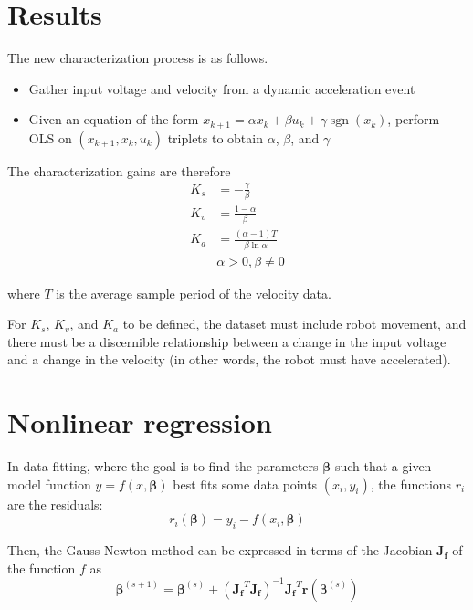 \documentclass[10pt,conference,compsoc]{IEEEtran}
\DeclareMathOperator{\sgn}{sgn}
\newcommand{\mat}[1] {\mathbf{#1}}
\begin{document}
\section{Results}

The new characterization process is as follows.
\begin{itemize}
  \item Gather input voltage and velocity from a dynamic acceleration event
  \item Given an equation of the form
    $x_{k+1} = \alpha x_k + \beta u_k + \gamma\sgn(x_k)$, perform OLS on
    $(x_{k+1}, x_k, u_k)$ triplets to obtain $\alpha$, $\beta$, and $\gamma$
\end{itemize}

The characterization gains are therefore
\begin{align}
  K_s &= -\frac{\gamma}{\beta} \\
  K_v &= \frac{1 - \alpha}{\beta} \\
  K_a &= \frac{(\alpha - 1) T}{\beta \ln\alpha} \\
      &\alpha > 0, \beta \neq 0 \nonumber
\end{align}

where $T$ is the average sample period of the velocity data.

For $K_s$, $K_v$, and $K_a$ to be defined, the dataset must include robot
movement, and there must be a discernible relationship between a change in the
input voltage and a change in the velocity (in other words, the robot must have
accelerated).

\section{Nonlinear regression}

In data fitting, where the goal is to find the parameters $\bm{\beta}$ such
that a given model function $y = f(x, \bm{\beta})$ best fits some data points
$(x_i, y_i)$, the functions $r_i$ are the residuals:
\begin{equation*}
  r_i(\bm{\beta}) = y_i - f(x_i, \bm{\beta})
\end{equation*}

Then, the Gauss-Newton method can be expressed in terms of the Jacobian
$\mat{J_f}$ of the function $f$ as
\begin{equation*}
  \bm{\beta}^{(s+1)} = \bm{\beta}^{(s)} +
    (\mat{J_f}^T \mat{J_f})^{-1} \mat{J_f}^T \mat{r}\left(\bm{\beta}^{(s)}\right)
\end{equation*}
\end{document}
